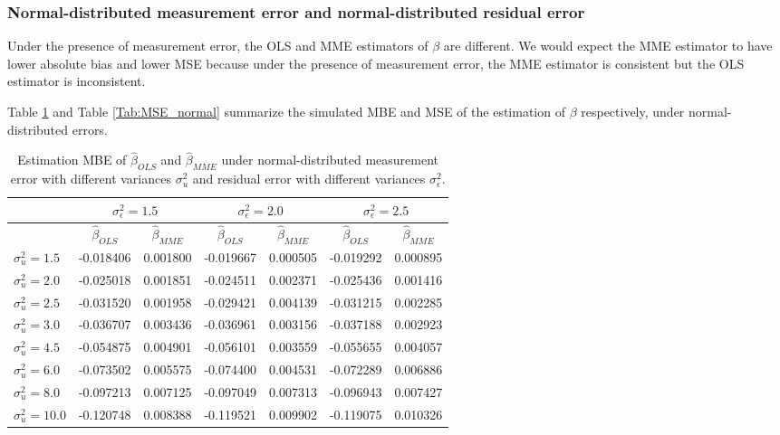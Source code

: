 \documentclass{article}
\begin{document}
\subsubsection{Normal-distributed measurement error and normal-distributed residual error}

Under the presence of measurement error, the OLS and MME estimators of $\beta$ are different.
We would expect the MME estimator to have lower absolute bias and lower MSE because under the presence of measurement error, the MME estimator is consistent but the OLS estimator is inconsistent.

Table \ref{Tab:MBE_normal} and Table \ref{Tab:MSE_normal} summarize the simulated MBE and MSE of the estimation of $\beta$ respectively, under normal-distributed errors.

\begin{table}[ht]
    \centering
    \caption{Estimation MBE of $\hat{\beta}_{OLS}$ and $\hat{\beta}_{MME}$ under normal-distributed measurement error with different variances $\sigma^2_u$ and residual error with different variances $\sigma^2_\epsilon$.}
    \label{Tab:MBE_normal}
    \begin{tabular}[t]{lcccccc}
        \hline
        &\multicolumn{2}{c}{$\sigma^2_\epsilon=1.5$}&\multicolumn{2}{c}{$\sigma^2_\epsilon=2.0$}&\multicolumn{2}{c}{$\sigma^2_\epsilon=2.5$}\\
        \hline
        &$\hat{\beta}_{OLS}$&$\hat{\beta}_{MME}$&$\hat{\beta}_{OLS}$&$\hat{\beta}_{MME}$&$\hat{\beta}_{OLS}$&$\hat{\beta}_{MME}$\\
        \hline
        $\sigma^2_u = 1.5$&-0.018406&0.001800&-0.019667&0.000505&-0.019292&0.000895\\
        $\sigma^2_u = 2.0$&-0.025018&0.001851&-0.024511&0.002371&-0.025436&0.001416\\
        $\sigma^2_u = 2.5$&-0.031520&0.001958&-0.029421&0.004139&-0.031215&0.002285\\
        $\sigma^2_u = 3.0$&-0.036707&0.003436&-0.036961&0.003156&-0.037188&0.002923\\
        $\sigma^2_u = 4.5$&-0.054875&0.004901&-0.056101&0.003559&-0.055655&0.004057\\
        $\sigma^2_u = 6.0$&-0.073502&0.005575&-0.074400&0.004531&-0.072289&0.006886\\
        $\sigma^2_u = 8.0$&-0.097213&0.007125&-0.097049&0.007313&-0.096943&0.007427\\
        $\sigma^2_u = 10.0$&-0.120748&0.008388&-0.119521&0.009902&-0.119075&0.010326\\
        \hline
    \end{tabular}
\end{table}
\end{document}
